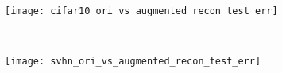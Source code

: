 \documentclass{article}
\begin{document}

    \centering
    \begin{subfigure}[t]{0.5\textwidth}
        \centering
        \texttt{[image: cifar10\_ori\_vs\_augmented\_recon\_test\_err]}
    \end{subfigure}%
    ~ 
    \begin{subfigure}[t]{0.5\textwidth}
        \centering
        \texttt{[image: svhn\_ori\_vs\_augmented\_recon\_test\_err]}
    \end{subfigure}
    
\end{document}
